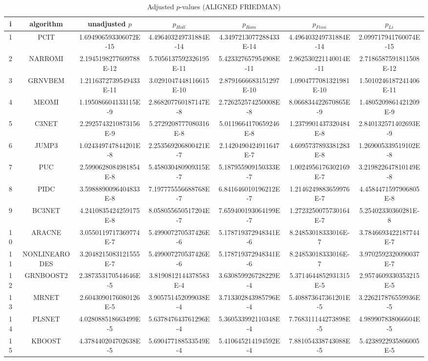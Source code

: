 \documentclass[a4paper,10pt]{article}
\begin{document}
\begin{landscape}
\begin{table}[!htp]
\centering\scriptsize
\caption{Adjusted $p$-values (ALIGNED FRIEDMAN)}
\begin{tabular}{ccccccc}
i&algorithm&unadjusted $p$&$p_{Holl}$&$p_{Rom}$&$p_{Finn}$&$p_{Li}$\\
\hline
1&PCIT&1.694906593306072E-15&4.496403249731884E-14&4.3497213077288433E-14&4.496403249731884E-14&2.099717941760074E-15\\
2&NARROMI&2.1945198277609788E-12&5.7056137592326195E-11&5.423327657954908E-11&2.962530221140014E-11&2.7186587591811508E-12\\
3&GRNVBEM&1.2116372739549433E-11&3.0291047448116615E-10&2.8791666683151297E-10&1.0904777081321981E-10&1.5010246187241406E-11\\
4&MEOMI&1.195086604133115E-9&2.868207760187147E-8&2.726252574250008E-8&8.066834422670865E-9&1.4805209861421209E-9\\
5&C3NET&2.2925743210873156E-9&5.2729208777080316E-8&5.0119664170659246E-8&1.2379901437320484E-8&2.840132571402693E-9\\
6&JUMP3&1.024349747844201E-8&2.253569206800421E-7&2.1420490424911647E-7&4.6095737893381283E-8&1.269005339519102E-8\\
7&PUC&2.5990628084981854E-8&5.458030480909315E-7&5.187955909150333E-7&1.0024956176302169E-7&3.219822647810149E-8\\
8&PIDC&3.5988890096404833E-8&7.197775556688768E-7&6.841646010196212E-7&1.2146249883659976E-7&4.4584471597906805E-8\\
9&BC3NET&4.2410835424259175E-8&8.058055650517204E-7&7.659400193064199E-7&1.2723250075730164E-7&5.25402330360281E-8\\
10&ARACNE&3.0550119717369774E-7&5.499007270537426E-6&5.178719372948341E-6&8.24853018333016E-7&3.7846693422187744E-7\\
11&NONLINEARODES&3.2048215083121555E-7&5.499007270537426E-6&5.178719372948341E-6&8.24853018333016E-7&3.9702592320090037E-7\\
12&GRNBOOST2&2.387353170544646E-5&3.8190812144378583E-4&3.630859926728229E-4&5.3714644852931315E-5&2.9574609330353215E-5\\
13&MRNET&2.6043090176080126E-5&3.905751452099038E-4&3.713302843985796E-4&5.408873647361201E-5&3.226217876559936E-5\\
14&PLSNET&4.028088518663499E-5&5.637847643761296E-4&5.360533992110348E-4&7.768311144273898E-5&4.989907838066604E-5\\
15&KBOOST&4.378440204702638E-5&5.690477188533549E-4&5.410645214194592E-4&7.881054338743088E-5&5.4238922935806005E-5\\

\end{tabular}
\end{table}
\end{landscape}
\end{document}
